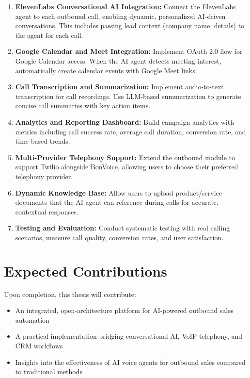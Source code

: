 \documentclass[12pt,a4paper,oneside]{book}
\begin{document}
\begin{enumerate}
    \item \textbf{ElevenLabs Conversational AI Integration:} Connect the ElevenLabs agent to each outbound call, enabling dynamic, personalized AI-driven conversations. This includes passing lead context (company name, details) to the agent for each call.

    \item \textbf{Google Calendar and Meet Integration:} Implement OAuth 2.0 flow for Google Calendar access. When the AI agent detects meeting interest, automatically create calendar events with Google Meet links.

    \item \textbf{Call Transcription and Summarization:} Implement audio-to-text transcription for call recordings. Use LLM-based summarization to generate concise call summaries with key action items.

    \item \textbf{Analytics and Reporting Dashboard:} Build campaign analytics with metrics including call success rate, average call duration, conversion rate, and time-based trends.

    \item \textbf{Multi-Provider Telephony Support:} Extend the outbound module to support Twilio alongside BonVoice, allowing users to choose their preferred telephony provider.

    \item \textbf{Dynamic Knowledge Base:} Allow users to upload product/service documents that the AI agent can reference during calls for accurate, contextual responses.

    \item \textbf{Testing and Evaluation:} Conduct systematic testing with real calling scenarios, measure call quality, conversion rates, and user satisfaction.
\end{enumerate}

\section{Expected Contributions}

Upon completion, this thesis will contribute:
\begin{itemize}
    \item An integrated, open-architecture platform for AI-powered outbound sales automation
    \item A practical implementation bridging conversational AI, VoIP telephony, and CRM workflows
    \item Insights into the effectiveness of AI voice agents for outbound sales compared to traditional methods
\end{itemize}




\end{document}
